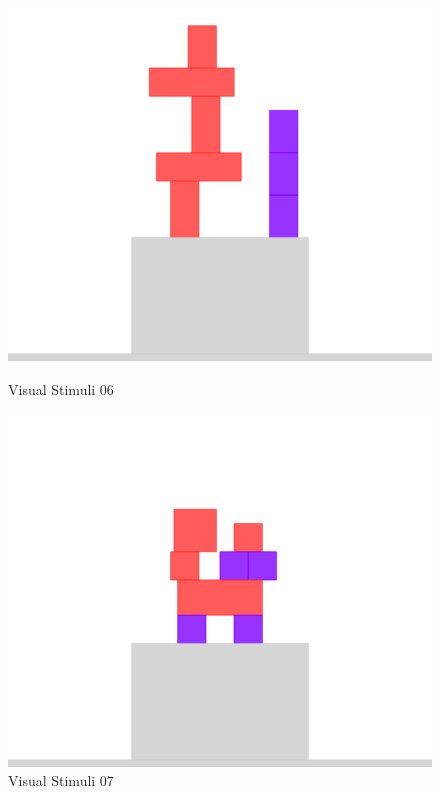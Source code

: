 \documentclass[10pt,letterpaper]{article}
\begin{document}
\begin{figure}[h]
    \parbox{.47\linewidth}{
        \centering
        \includegraphics[scale=0.3]{images/ensemble6.png}
        \caption{Visual Stimuli 06}
        \label{table:llama70B-fixed-deceiver-correlation}
    }
    \hfill
    \parbox{.47\linewidth}{
        \centering
        \includegraphics[scale=0.3]{images/ensemble7.png}
        \caption{Visual Stimuli 07}
        \label{table:gpt35-fixed-deceiver-correlation}
    }
\end{figure}
\end{document}
